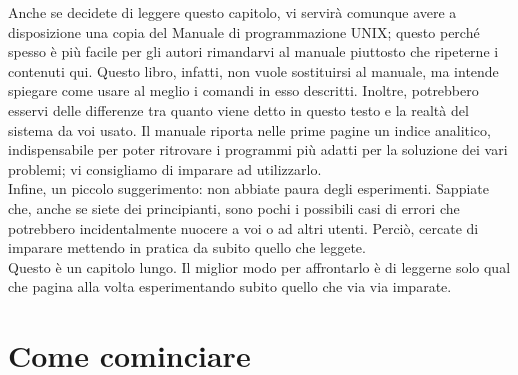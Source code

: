 Anche se decidete di leggere questo capitolo, vi servirà comunque avere a disposizione
una copia del Manuale di programmazione UNIX; questo perché spesso è più facile
per gli autori rimandarvi al manuale piuttosto che ripeterne i contenuti qui. Questo
libro, infatti, non vuole sostituirsi al manuale, ma intende spiegare come usare al meglio
i comandi in esso descritti. Inoltre, potrebbero esservi delle differenze tra quanto
viene detto in questo testo e la realtà del sistema da voi usato. Il manuale riporta nelle
prime pagine un indice analitico, indispensabile per poter ritrovare i programmi più
adatti per la soluzione dei vari problemi; vi consigliamo di imparare ad utilizzarlo.\\
Infine, un piccolo suggerimento: non abbiate paura degli esperimenti. Sappiate
che, anche se siete dei principianti, sono pochi i possibili casi di errori che potrebbero
incidentalmente nuocere a voi o ad altri utenti. Perciò, cercate di imparare mettendo
in pratica da subito quello che leggete.\\
Questo è un capitolo lungo. Il miglior modo per affrontarlo è di leggerne solo qual
che pagina alla volta esperimentando subito quello che via via imparate.
\section{Come cominciare}
